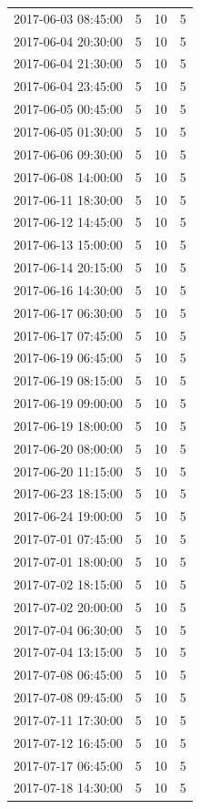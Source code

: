 \begin{tabular}{lrrr}
2017-06-03 08:45:00 & 5 & 10 & 5 \\
2017-06-04 20:30:00 & 5 & 10 & 5 \\
2017-06-04 21:30:00 & 5 & 10 & 5 \\
2017-06-04 23:45:00 & 5 & 10 & 5 \\
2017-06-05 00:45:00 & 5 & 10 & 5 \\
2017-06-05 01:30:00 & 5 & 10 & 5 \\
2017-06-06 09:30:00 & 5 & 10 & 5 \\
2017-06-08 14:00:00 & 5 & 10 & 5 \\
2017-06-11 18:30:00 & 5 & 10 & 5 \\
2017-06-12 14:45:00 & 5 & 10 & 5 \\
2017-06-13 15:00:00 & 5 & 10 & 5 \\
2017-06-14 20:15:00 & 5 & 10 & 5 \\
2017-06-16 14:30:00 & 5 & 10 & 5 \\
2017-06-17 06:30:00 & 5 & 10 & 5 \\
2017-06-17 07:45:00 & 5 & 10 & 5 \\
2017-06-19 06:45:00 & 5 & 10 & 5 \\
2017-06-19 08:15:00 & 5 & 10 & 5 \\
2017-06-19 09:00:00 & 5 & 10 & 5 \\
2017-06-19 18:00:00 & 5 & 10 & 5 \\
2017-06-20 08:00:00 & 5 & 10 & 5 \\
2017-06-20 11:15:00 & 5 & 10 & 5 \\
2017-06-23 18:15:00 & 5 & 10 & 5 \\
2017-06-24 19:00:00 & 5 & 10 & 5 \\
2017-07-01 07:45:00 & 5 & 10 & 5 \\
2017-07-01 18:00:00 & 5 & 10 & 5 \\
2017-07-02 18:15:00 & 5 & 10 & 5 \\
2017-07-02 20:00:00 & 5 & 10 & 5 \\
2017-07-04 06:30:00 & 5 & 10 & 5 \\
2017-07-04 13:15:00 & 5 & 10 & 5 \\
2017-07-08 06:45:00 & 5 & 10 & 5 \\
2017-07-08 09:45:00 & 5 & 10 & 5 \\
2017-07-11 17:30:00 & 5 & 10 & 5 \\
2017-07-12 16:45:00 & 5 & 10 & 5 \\
2017-07-17 06:45:00 & 5 & 10 & 5 \\
2017-07-18 14:30:00 & 5 & 10 & 5 \\

\end{tabular}
